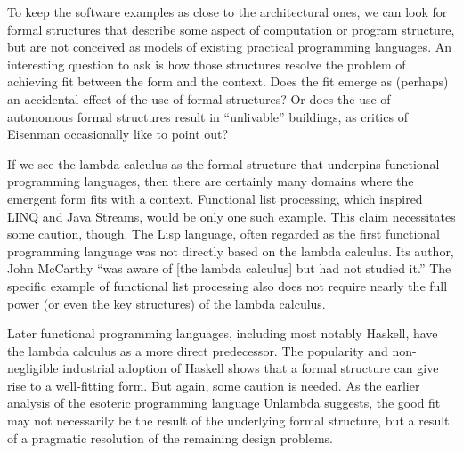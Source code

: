 To keep the software examples as close to the architectural ones, we can look for formal
structures that describe some aspect of computation or program structure, but are not conceived
as models of existing practical programming languages. An interesting question to ask is how
those structures resolve the problem of achieving fit between the form and the context. Does the
fit emerge as (perhaps) an accidental effect of the use of formal structures? Or does the use
of autonomous formal structures result in ``unlivable'' buildings, as critics of Eisenman
occasionally like to point out?

If we see the lambda calculus as the formal structure that underpins functional programming
languages, then there are certainly many domains where the emergent form fits with a context.
Functional list processing, which inspired LINQ and Java Streams, would be only one such example.
This claim necessitates some caution, though. The Lisp language, often regarded
as the first functional programming language was not directly based on the lambda calculus.
Its author, John McCarthy ``was aware of [the lambda calculus] but had not studied
it.'' The specific
example of functional list processing also does not require nearly the full power (or even the
key structures) of the lambda calculus.

Later functional programming languages, including most notably Haskell, have the lambda
calculus as a more direct predecessor. The popularity and non-negligible industrial adoption
of Haskell shows that a formal structure can give rise to a well-fitting form.
But again, some caution is needed. As the earlier analysis of the esoteric programming language
Unlambda suggests, the good fit may not necessarily be the result of the underlying formal
structure, but a result of a pragmatic resolution of the remaining design problems.



